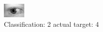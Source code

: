 \begin{figure}[h!]
\begin{center}
\includegraphics[width=0.60\columnwidth]{figures/ID782_class_2_target_4.png}
\end{center}
\caption{ Classification: 2 actual target: 4}
\label{fig:ID782_class_2_target_4}
\end{figure}
